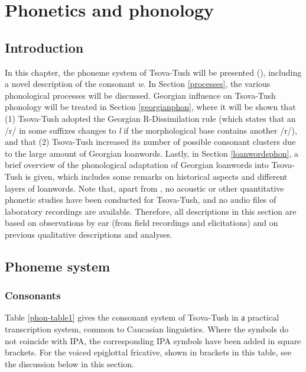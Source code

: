 \chapter{Phonetics and phonology} \label{phon}

\section{Introduction}

In this chapter, the phoneme system of Tsova-Tush will be presented (), including a novel description of the consonant \textit{w}. In Section \ref{processes}, the various phonological processes will be discussed. Georgian influence on Tsova-Tush phonology will be treated in Section \ref{georgianphon}, where it will be shown that (1) Tsova-Tush adopted the Georgian R-Dissimilation rule (which states that an /r/ in some suffixes changes to \textit{l} if the morphological base contains another /r/), and that (2) Tsova-Tush increased its number of possible consonant clusters due to the large amount of Georgian loanwords. Lastly, in Section \ref{loanwordsphon}, a brief overview of the phonological adaptation of Georgian loanwords into Tsova-Tush is given, which includes some remarks on historical aspects and different layers of loanwords. Note that, apart from \textcite{haukhakim}, no acoustic or other quantitative phonetic studies have been conducted for Tsova-Tush, and no audio files of laboratory recordings are available. Therefore, all descriptions in this section are based on observations by ear (from field recordings and elicitations) and on previous qualitative descriptions and analyses. 

\section{Phoneme system} \label{phonsystem}


\subsection{Consonants}
Table \ref{phon-table1} gives the consonant system of Tsova-Tush in а practical transcription system, common to Caucasian linguistics. Where the symbols do not coincide with IPA, the corresponding IPA symbols have been added in square brackets. For the voiced epiglottal fricative, shown in brackets in this table, see the discussion below in this section.



